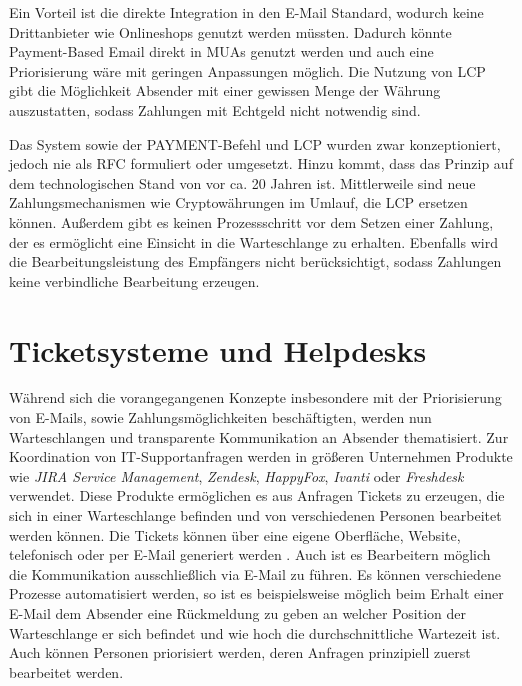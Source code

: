 Ein Vorteil ist die direkte Integration in den E-Mail Standard, wodurch keine Drittanbieter wie Onlineshops genutzt werden müssten. Dadurch könnte Payment-Based Email direkt in MUAs genutzt werden und auch eine Priorisierung wäre mit geringen Anpassungen möglich. Die Nutzung von LCP gibt die Möglichkeit Absender mit einer gewissen Menge der Währung auszustatten, sodass Zahlungen mit Echtgeld nicht notwendig sind.

Das System sowie der PAYMENT-Befehl und LCP wurden zwar konzeptioniert, jedoch nie als RFC formuliert oder umgesetzt. Hinzu kommt, dass das Prinzip auf dem technologischen Stand von vor ca. 20 Jahren ist. Mittlerweile sind neue Zahlungsmechanismen wie Cryptowährungen im Umlauf, die LCP ersetzen können. Außerdem gibt es keinen Prozessschritt vor dem Setzen einer Zahlung, der es ermöglicht eine Einsicht in die Warteschlange zu erhalten. Ebenfalls wird die Bearbeitungsleistung des Empfängers nicht berücksichtigt, sodass Zahlungen keine verbindliche Bearbeitung erzeugen. \citep[S. 3 f.]{Turner2003}


\section{Ticketsysteme und Helpdesks}
Während sich die vorangegangenen Konzepte insbesondere mit der Priorisierung von E-Mails, sowie Zahlungsmöglichkeiten beschäftigten, werden nun Warteschlangen und transparente Kommunikation an Absender thematisiert. Zur Koordination von IT-Supportanfragen werden in größeren Unternehmen Produkte wie \textit{JIRA Service Management}, \textit{Zendesk}, \textit{HappyFox}, \textit{Ivanti} oder \textit{Freshdesk} verwendet. Diese Produkte ermöglichen es aus Anfragen Tickets zu erzeugen, die sich in einer Warteschlange befinden und von verschiedenen Personen bearbeitet werden können. Die Tickets können über eine eigene Oberfläche, Website, telefonisch oder per E-Mail generiert werden \citep{jiramail}. Auch ist es Bearbeitern möglich die Kommunikation ausschließlich via E-Mail zu führen. Es können verschiedene Prozesse automatisiert werden, so ist es beispielsweise möglich beim Erhalt einer E-Mail dem Absender eine Rückmeldung zu geben an welcher Position der Warteschlange er sich befindet und wie hoch die durchschnittliche Wartezeit ist. Auch können Personen priorisiert werden, deren Anfragen prinzipiell zuerst bearbeitet werden.

